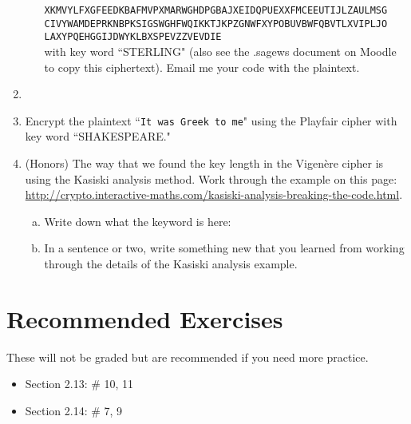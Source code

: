 \documentclass[12pt]{amsart}
\theoremstyle{plain}
\theoremstyle{definition}
\begin{document}
\begin{enumerate}[1.]
\begin{enumerate}[a.]
		\texttt{XKMVYLFXGFEEDKBAFMVPXMARWGHDPGBAJXEIDQPUEXXFMCEEUTIJLZAULMSG\\
		CIVYWAMDEPRKNBPKSIGSWGHFWQIKKTJKPZGNWFXYPOBUVBWFQBVTLXVIPLJO\\
		LAXYPQEHGGIJDWYKLBXSPEVZZVEVDIE}\\
		
		with key word ``STERLING" (also see the .sagews document on Moodle to copy this ciphertext).  Email me your code with the plaintext.
		\end{enumerate}		
		\item 

	\item Encrypt the plaintext ``\texttt{It was Greek to me}" using the Playfair cipher with key word ``SHAKESPEARE."\\
		\begin{framed}
		\vspace{3in}
		\end{framed}
	
	\newpage \item (Honors) The way that we found the key length in the Vigen\`{e}re cipher is using the Kasiski analysis method.  Work through the example on this page: \url{http://crypto.interactive-maths.com/kasiski-analysis-breaking-the-code.html}.
	\begin{enumerate}[a.]
	\item Write down what the keyword is here:
		\begin{framed}
		\vspace{.5in}
		\end{framed}
	\item In a sentence or two, write something new that you learned from working through the details of the Kasiski analysis example.
		\begin{framed}
		\vspace{2in}
		\end{framed}
	\end{enumerate}
	
\end{enumerate}

\section{Recommended Exercises}
\noindent These will not be graded but are recommended if you need more practice.
\begin{itemize}
	\item Section 2.13: \# 10, 11
	\item Section 2.14: \# 7, 9
\end{itemize}
	
\end{document}
